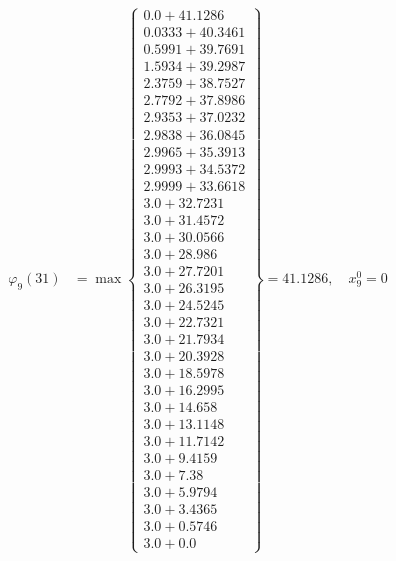 \documentclass{article}
\begin{document}
\begin{align*}
  
\varphi_{9}(31) &= \max \left\{ \begin{array}{c}
0.0 + 41.1286 \\
 0.0333 + 40.3461 \\
 0.5991 + 39.7691 \\
 1.5934 + 39.2987 \\
 2.3759 + 38.7527 \\
 2.7792 + 37.8986 \\
 2.9353 + 37.0232 \\
 2.9838 + 36.0845 \\
 2.9965 + 35.3913 \\
 2.9993 + 34.5372 \\
 2.9999 + 33.6618 \\
 3.0 + 32.7231 \\
 3.0 + 31.4572 \\
 3.0 + 30.0566 \\
 3.0 + 28.986 \\
 3.0 + 27.7201 \\
 3.0 + 26.3195 \\
 3.0 + 24.5245 \\
 3.0 + 22.7321 \\
 3.0 + 21.7934 \\
 3.0 + 20.3928 \\
 3.0 + 18.5978 \\
 3.0 + 16.2995 \\
 3.0 + 14.658 \\
 3.0 + 13.1148 \\
 3.0 + 11.7142 \\
 3.0 + 9.4159 \\
 3.0 + 7.38 \\
 3.0 + 5.9794 \\
 3.0 + 3.4365 \\
 3.0 + 0.5746 \\
 3.0 + 0.0
\end{array} \right\}=41.1286,\quad x_{9}^0=0\\
  
  
  

\end{align*}
\end{document}

